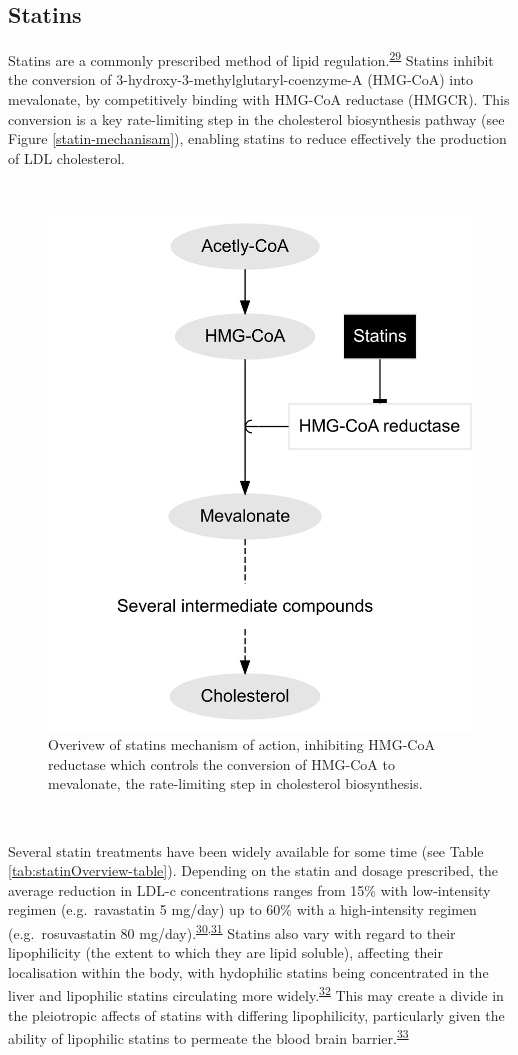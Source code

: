 \documentclass[a4paper, twoside]{templates/ociamthesis}
\begin{document}
\hypertarget{intro-statins}{%
\subsection{Statins}\label{intro-statins}}

Statins are a commonly prescribed method of lipid regulation.\textsuperscript{\protect\hyperlink{ref-collins2016}{29}} Statins inhibit the conversion of 3-hydroxy-3-methylglutaryl-coenzyme-A (HMG-CoA) into mevalonate, by competitively binding with HMG-CoA reductase (HMGCR). This conversion is a key rate-limiting step in the cholesterol biosynthesis pathway (see Figure \ref{statin-mechanisam}), enabling statins to reduce effectively the production of LDL cholesterol.

~





\begin{figure}[H]

{\centering \includegraphics[width=0.5\linewidth]{figures/background/statinPath} 

}

\caption[Statin mechanism of action]{Overivew of statins mechanism of action, inhibiting HMG-CoA reductase which controls the conversion of HMG-CoA to mevalonate, the rate-limiting step in cholesterol biosynthesis.}\label{fig:statin-mechanisam}
\end{figure}

~

Several statin treatments have been widely available for some time (see Table \ref{tab:statinOverview-table}). Depending on the statin and dosage prescribed, the average reduction in LDL-c concentrations ranges from 15\% with low-intensity regimen (e.g.~ravastatin 5 mg/day) up to 60\% with a high-intensity regimen (e.g.~rosuvastatin 80 mg/day).\textsuperscript{\protect\hyperlink{ref-collins2016a}{30},\protect\hyperlink{ref-law2003}{31}} Statins also vary with regard to their lipophilicity (the extent to which they are lipid soluble), affecting their localisation within the body, with hydophilic statins being concentrated in the liver and lipophilic statins circulating more widely.\textsuperscript{\protect\hyperlink{ref-schachter2005}{32}} This may create a divide in the pleiotropic affects of statins with differing lipophilicity, particularly given the ability of lipophilic statins to permeate the blood brain barrier.\textsuperscript{\protect\hyperlink{ref-sierra2011}{33}}
\end{document}
